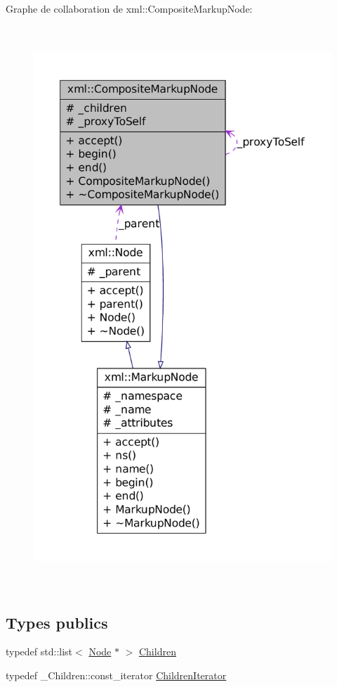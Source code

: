 Graphe de collaboration de xml::CompositeMarkupNode:
\nopagebreak
\begin{figure}[H]
\begin{center}
\leavevmode
\includegraphics[height=600pt]{classxml_1_1_composite_markup_node__coll__graph}
\end{center}
\end{figure}
\subsection*{Types publics}
\begin{DoxyCompactItemize}
\item 
typedef std::list$<$ \hyperlink{classxml_1_1_node}{Node} $\ast$ $>$ \hyperlink{classxml_1_1_composite_markup_node_ac70e1fdb5fc2e0011378f7284c31fe5c}{Children}
\item 
typedef \_\-Children::const\_\-iterator \hyperlink{classxml_1_1_composite_markup_node_abdd7123eab75fb90a4a95b1976693ed7}{ChildrenIterator}
\end{DoxyCompactItemize}
